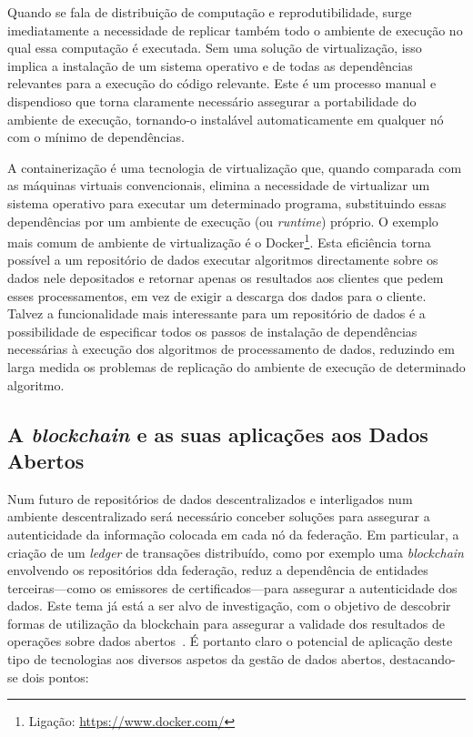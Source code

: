\documentclass[sigconf,nonacm]{acmart}
\begin{document}
Quando se fala de distribuição de computação e reprodutibilidade, surge imediatamente a necessidade de replicar também todo o ambiente de execução no qual essa computação é executada. Sem uma solução de virtualização, isso implica a instalação de um sistema operativo e de todas as dependências relevantes para a execução do código relevante. Este é um processo manual e dispendioso que torna claramente necessário assegurar a portabilidade do ambiente de execução, tornando-o instalável automaticamente em qualquer nó com o mínimo de dependências. 

A containerização é uma tecnologia de virtualização que, quando comparada com as máquinas virtuais convencionais, elimina a necessidade de virtualizar um sistema operativo para executar um determinado programa, substituindo essas dependências por um ambiente de execução (ou \textit{runtime}) próprio. O exemplo mais comum de ambiente de virtualização é o Docker\footnote{Ligação: \url{https://www.docker.com/}}. Esta eficiência torna possível a um repositório de dados executar algoritmos directamente sobre os dados nele depositados e retornar apenas os resultados aos clientes que pedem esses processamentos, em vez de exigir a descarga dos dados para o cliente. Talvez a funcionalidade mais interessante para um repositório de dados é a possibilidade de especificar todos os passos de instalação de dependências necessárias à execução dos algoritmos de processamento de dados, reduzindo em larga medida os problemas de replicação do ambiente de execução de determinado algoritmo.


\subsection{A \emph{blockchain} e as suas aplicações aos Dados Abertos} %
\label{sub:a_emph_blockchain_e_as_suas_aplicacoes_aos_dados_abertos}

Num futuro de repositórios de dados descentralizados e interligados num ambiente descentralizado será necessário conceber soluções para assegurar a autenticidade da informação colocada em cada nó da federação. Em particular, a criação de um \emph{ledger} de transações distribuído, como por exemplo uma \emph{blockchain} envolvendo os repositórios dda federação, reduz a dependência de entidades terceiras---como os emissores de certificados---para assegurar a autenticidade dos dados. Este tema já está a ser alvo de investigação, com o objetivo de descobrir formas de utilização da blockchain para assegurar a validade dos resultados de operações sobre dados abertos~\cite{10.1007/978-3-030-23946-6_28}. É portanto claro o potencial de aplicação deste tipo de tecnologias aos diversos aspetos da gestão de dados abertos, destacando-se dois pontos:
\end{document}
